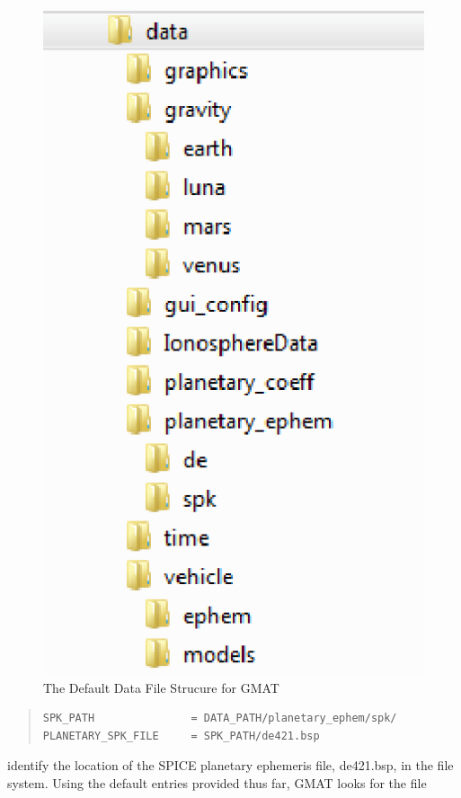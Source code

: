 \documentclass[letterpaper,10pt]{article}%
\begin{document}
{\begin{figure}[htb]
  \begin{center}
	\includegraphics{DataFileLayout.eps}
	\caption{The Default Data File Strucure for GMAT}
	\label{fig:DataFileStrucure}
  \end{center}
\end{figure}


\begin{quote}
\begin{verbatim}
SPK_PATH               = DATA_PATH/planetary_ephem/spk/
PLANETARY_SPK_FILE     = SPK_PATH/de421.bsp
\end{verbatim}
\end{quote}

\noindent identify the location of the SPICE planetary ephemeris file, de421.bsp, in the file system.  Using the default entries provided thus far, GMAT looks for the file

}
\end{document}
